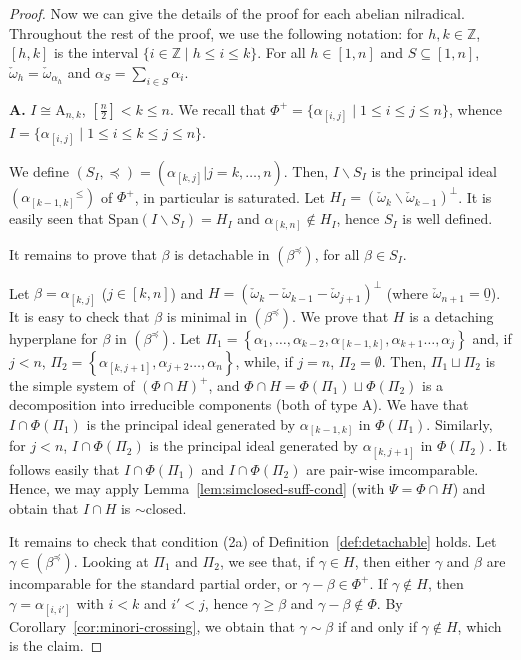 \documentclass[ALCO,published]{cedram}
\theoremstyle{plain}
\newcommand\nl{\par\noindent}
\newcommand\smeno{\smallsetminus}
\newcommand\nullvec{\underline 0}
\newcommand\ganz{\mathbb Z}
\newcommand\gen{\mathrm{Span}}
\newcommand\al{\alpha}
\newcommand\be{\beta}
\newcommand\ga{\gamma}
\newcommand\preq{\preccurlyeq}
\renewcommand{\leq}{\leqslant}
\begin{document}
\begin{proof}
Now we can give the details of the proof for each abelian nilradical.
Throughout the rest of the proof, we use the following notation: for $h, k\in \ganz$, $[h,k]$ is the interval  $\{i\in \ganz\mid h\leq i\leq k\}$. 
For all $h\in [1,n]$ and  $S\subseteq [1, n]$,  $\check\omega_h=\check\omega_{\al_h}$ and  $\al_{S}=\sum\limits_{i\in S}\al_i$.


\nl 
{\bf A.} $I\cong \mathrm A_{n, k}$, $\left[\frac{n}{2}\right]< k\leq n$. We recall that $\Phi^+=\{\al_{[i, j]}\mid 1\leq i\leq j\leq n\}$, whence $I=\{\al_{[i, j]}\mid 1\leq i\leq k\leq j\leq n\}$.

\par
We define $(S_I, \preq) =\left(\al_{[k,j]}| j=k, \dots, n\right)$.
Then, $I\smeno S_I$ is the principal ideal $({\al_{[k-1, k]}}^\leq)$ of $\Phi^+$, in particular is saturated.
Let $H_I=(\check\omega_k\smeno \check\omega_{k-1})^\perp$. 
It is easily seen that $\gen(I\smeno S_I)=H_I$ and 
$\al_{[k,n]} \not\in H_I$, hence $S_I$ is well defined.

\par
It remains to prove that $\be$ is detachable in  $(\be^\preq)$, for all $\be\in S_I$.

\par
Let $\be=\al_{[k,j]}$ ($j\in[k,n]$) and $H=(\check\omega_k-\check\omega_{k-1}-\check\omega_{j+1})^\perp$ (where $\check\omega_{n+1}=\nullvec$). 
It is easy to check that  $\be$ is minimal in  $(\be^\preq)$.
We prove that $H$ is a detaching hyperplane for $\be$ in  $(\be^\preq)$. 
Let $\Pi_1=\left\{\al_1, \dots, \al_{k-2}, \al_{[k-1,k]}, \al_{k+1}\dots, \al_j\right\}$ and,  if $j< n$, $\Pi_2= \left\{\al_{[k, j+1]}, \al_{j+2}\dots, \al_n\right\}$, while, if $j=n$, $\Pi_2=\emptyset$.
Then, $\Pi_1\sqcup\Pi_2$ is the simple system of $(\Phi\cap H)^+$, 
and $\Phi\cap H=\Phi(\Pi_1)\sqcup \Phi(\Pi_2)$ is a decomposition into irreducible components (both of type $\mathrm A$).
We have that $I\cap \Phi(\Pi_1)$ is the principal ideal generated by $\al_{[k-1,k]}$ in $\Phi(\Pi_1)$.
Similarly, for $j<n$, $I\cap \Phi(\Pi_2)$ is the principal ideal generated by $\al_{[k,j+1]}$ in $\Phi(\Pi_2)$.
It follows easily that $I\cap \Phi(\Pi_1)$ and $I\cap \Phi(\Pi_2)$
are pair-wise imcomparable.
Hence, we may apply Lemma~\ref{lem:simclosed-suff-cond} (with $\Psi=\Phi\cap H$) and  obtain that $I\cap H$ is $\sim$closed.
\par

It remains to check that condition (2a) of Definition~\ref{def:detachable} holds. 
Let $\ga\in (\be^\preq)$.
Looking at $\Pi_1$ and $\Pi_2$, we see that, if $\ga\in H$, then either $\ga$ and $\be$ are incomparable for the standard partial order,  or $\ga-\be\in \Phi^+$. 
	If $\ga\not\in H$, then $\ga=\al_{[i, i']}$ with $i<k$ and $i'<j$, hence $\ga\geq \be$ and $\ga-\be\not\in \Phi$.
By Corollary~\ref{cor:minori-crossing}, we obtain that $\ga\sim \be$ if and only if $\ga\not\in H$, which is the claim.



\end{proof}
\end{document}
